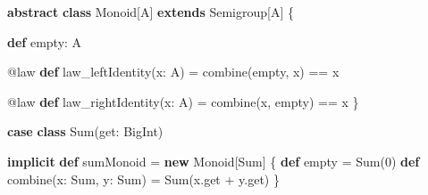 \documentclass[
  ignorenonframetext,
]{beamer}
\newenvironment{Shaded}{}{}
\newcommand{\DecValTok}[1]{\textcolor[rgb]{0.25,0.63,0.44}{#1}}
\newcommand{\FunctionTok}[1]{\textcolor[rgb]{0.02,0.16,0.49}{#1}}
\newcommand{\KeywordTok}[1]{\textcolor[rgb]{0.00,0.44,0.13}{\textbf{#1}}}
\newcommand{\NormalTok}[1]{#1}
\begin{document}
\begin{frame}[fragile]

\begin{Shaded}
\begin{Highlighting}[]
\KeywordTok{abstract} \KeywordTok{class}\NormalTok{ Monoid[A]}
  \KeywordTok{extends}\NormalTok{ Semigroup[A] \{}

  \KeywordTok{def}\NormalTok{ empty: A}

\NormalTok{  @law }\KeywordTok{def} \FunctionTok{law_leftIdentity}\NormalTok{(x: A) =}
    \FunctionTok{combine}\NormalTok{(empty, x) == x}

\NormalTok{  @law }\KeywordTok{def} \FunctionTok{law_rightIdentity}\NormalTok{(x: A) =}
    \FunctionTok{combine}\NormalTok{(x, empty) == x}
\NormalTok{\}}
\end{Highlighting}
\end{Shaded}

\end{frame}

\begin{frame}[fragile]

\begin{Shaded}
\begin{Highlighting}[]
\KeywordTok{case} \KeywordTok{class} \FunctionTok{Sum}\NormalTok{(get: BigInt)}

\KeywordTok{implicit} \KeywordTok{def}\NormalTok{ sumMonoid = }\KeywordTok{new}\NormalTok{ Monoid[Sum] \{}
  \KeywordTok{def}\NormalTok{ empty = }\FunctionTok{Sum}\NormalTok{(}\DecValTok{0}\NormalTok{)}
  \KeywordTok{def} \FunctionTok{combine}\NormalTok{(x: Sum, y: Sum) = }\FunctionTok{Sum}\NormalTok{(x.}\FunctionTok{get}\NormalTok{ + y.}\FunctionTok{get}\NormalTok{)}
\NormalTok{\}}
\end{Highlighting}
\end{Shaded}

\end{frame}
\end{document}
